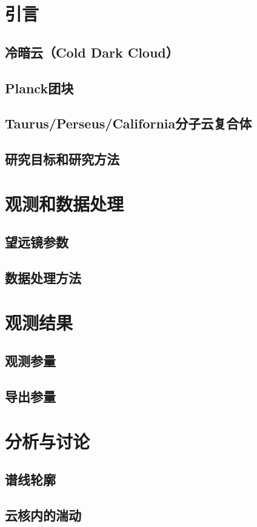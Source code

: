 \documentclass[UTF8, nocolorlinks]{pkuthss}
\begin{document}
	\tableofcontents
	\mainmatter
\chapter{引言}
	\section{冷暗云（Cold Dark Cloud）}
	\section{Planck团块}
	\section{Taurus/Perseus/California分子云复合体}
	\section{研究目标和研究方法}
\chapter{观测和数据处理}
	\section{望远镜参数}
	\section{数据处理方法}
\chapter{观测结果}
	\section{观测参量}
	\section{导出参量}
\chapter{分析与讨论}
	\section{谱线轮廓}
	\section{云核内的湍动}
\end{document}
